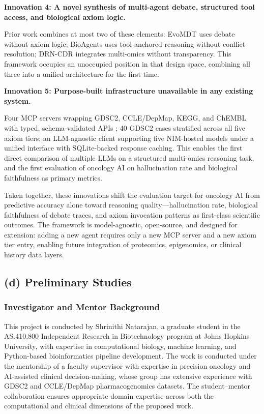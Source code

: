 \documentclass[11pt,letterpaper]{article}
\begin{document}
\textbf{Innovation 4: A novel synthesis of multi-agent debate, structured tool access, and biological axiom logic.}

Prior work combines at most two of these elements: EvoMDT \cite{ref11} uses debate without
axiom logic; BioAgents \cite{ref17} uses tool-anchored reasoning without conflict resolution;
DRN-CDR \cite{ref9} integrates multi-omics without transparency. This framework occupies an
unoccupied position in that design space, combining all three into a unified architecture for the
first time.

\textbf{Innovation 5: Purpose-built infrastructure unavailable in any existing system.}

Four MCP servers wrapping GDSC2, CCLE/DepMap, KEGG, and ChEMBL with typed,
schema-validated APIs \cite{ref15,ref16}; 40 GDSC2 cases stratified across all five axiom tiers;
an LLM-agnostic client supporting five NIM-hosted models under a unified interface with
SQLite-backed response caching. This enables the first direct comparison of multiple LLMs on
a structured multi-omics reasoning task, and the first evaluation of oncology AI on hallucination
rate and biological faithfulness as primary metrics.

Taken together, these innovations shift the evaluation target for oncology AI from predictive
accuracy alone toward reasoning quality---hallucination rate, biological faithfulness of debate
traces, and axiom invocation patterns as first-class scientific outcomes. The framework is
model-agnostic, open-source, and designed for extension: adding a new agent requires only a
new MCP server and a new axiom tier entry, enabling future integration of proteomics,
epigenomics, or clinical history data layers.

\subsection{(d) Preliminary Studies}

\subsubsection{Investigator and Mentor Background}

This project is conducted by Shrinithi Natarajan, a graduate student in the AS.410.800
Independent Research in Biotechnology program at Johns Hopkins University, with expertise
in computational biology, machine learning, and Python-based bioinformatics pipeline development.
The work is conducted under the mentorship of a faculty supervisor with expertise in precision
oncology and AI-assisted clinical decision-making, whose group has extensive experience
with GDSC2 and CCLE/DepMap pharmacogenomics datasets. The student--mentor collaboration
ensures appropriate domain expertise across both the computational and clinical dimensions of
the proposed work.
\end{document}
